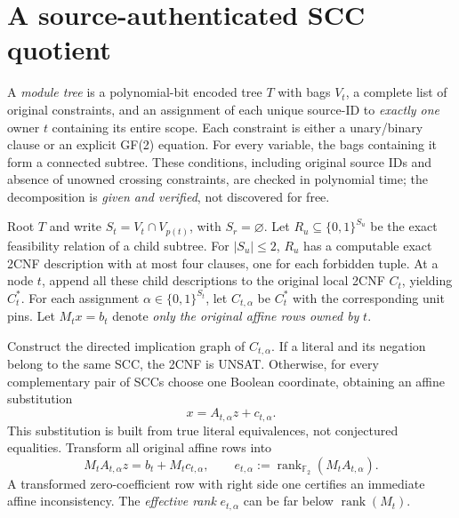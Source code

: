 \documentclass[11pt]{article}
\newcommand{\F}{\mathbb F_2}
\begin{document}
\section{A source-authenticated SCC quotient}
A \emph{module tree} is a polynomial-bit encoded tree $T$ with bags $V_t$, a complete list of original constraints, and an assignment of each unique source-ID to \emph{exactly one} owner $t$ containing its entire scope. Each constraint is either a unary/binary clause or an explicit GF(2) equation. For every variable, the bags containing it form a connected subtree. These conditions, including original source IDs and absence of unowned crossing constraints, are checked in polynomial time; the decomposition is \emph{given and verified}, not discovered for free.

Root $T$ and write $S_t=V_t\cap V_{p(t)}$, with $S_r=\varnothing$. Let $R_u\subseteq\{0,1\}^{S_u}$ be the exact feasibility relation of a child subtree. For $|S_u|\le2$, $R_u$ has a computable exact 2CNF description with at most four clauses, one for each forbidden tuple. At a node $t$, append all these child descriptions to the original local 2CNF $C_t$, yielding $C_t^*$. For each assignment $\alpha\in\{0,1\}^{S_t}$, let $C_{t,\alpha}$ be $C_t^*$ with the corresponding unit pins. Let $M_t x=b_t$ denote \emph{only the original affine rows owned by} $t$.

Construct the directed implication graph of $C_{t,\alpha}$. If a literal and its negation belong to the same SCC, the 2CNF is UNSAT. Otherwise, for every complementary pair of SCCs choose one Boolean coordinate, obtaining an affine substitution
\[
 x=A_{t,\alpha}z+c_{t,\alpha}.
\]
This substitution is built from true literal equivalences, not conjectured equalities. Transform all original affine rows into
\[
 M_tA_{t,\alpha}z=b_t+M_tc_{t,\alpha},
 \qquad e_{t,\alpha}:=\operatorname{rank}_{\F}(M_tA_{t,\alpha}).
\]
A transformed zero-coefficient row with right side one certifies an immediate affine inconsistency. The \emph{effective rank} $e_{t,\alpha}$ can be far below $\operatorname{rank}(M_t)$.
\end{document}
